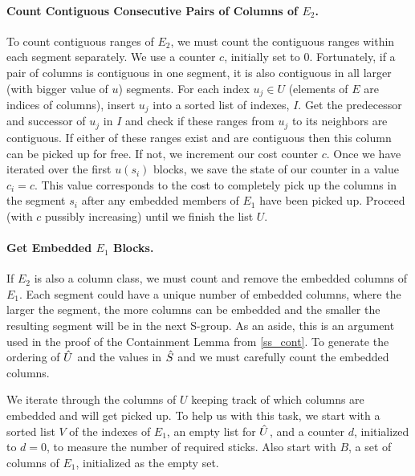 \paragraph{Count Contiguous Consecutive Pairs of Columns of $E_2$.}
To count contiguous ranges of $E_2$, we must count the contiguous ranges within each segment separately.  We use a counter $c$, initially set to $0$.
Fortunately, if a pair of columns is contiguous in one segment, it is also contiguous in all larger (with bigger value of $u$) segments.
For each index $u_j \in U$ (elements of $E$ are indices of columns),
 insert $u_j$ into a sorted list of indexes, $I$.
Get the predecessor and successor of $u_j$ in $I$ and check if these ranges from $u_j$ to its neighbors are contiguous.
If either of these ranges exist and are contiguous
 then this column can be picked up for free.
If not, we increment our cost counter $c$.
Once we have iterated over the first $u(s_i)$ blocks, we save the state of our counter in a value $c_i = c$.
This value corresponds to the cost to completely pick up the columns in the segment $s_i$ after any embedded members of $E_1$ have been picked up.
Proceed (with $c$ pussibly increasing)  until we finish the list $U$.


\paragraph{Get Embedded $E_1$ Blocks.}
If $E_2$ is also a column class, we must count and remove the embedded columns of $E_1$.
Each segment could have a unique number of embedded columns, where the larger the segment, the more columns can be embedded and the smaller the resulting segment will be in the next S-group.
As an aside, this is an argument used in the proof of the Containment Lemma
from \ref{ss_cont}.
To generate the ordering of $\hat{U}$ and the values in $\hat{S}$ and
we must carefully count the embedded columns.

We iterate through the columns of $U$ keeping track of which columns
 are embedded and will get picked up.
To help us with this task, we start with a sorted list $V$
of the indexes of $E_1$, an empty list for $\hat{U}$,
 and a counter $d$, initialized to $d=0$,
 to measure the number of required sticks.
Also start with $B$, a set of columns of $E_1$, initialized as the empty set.

